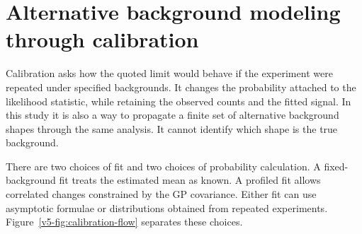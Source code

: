 \section{Alternative background modeling through calibration}
\label{v5-sec:calibration}\label{sec:v5-calibration}
Calibration asks how the quoted limit would behave if the experiment were
repeated under specified backgrounds. It changes the probability attached
to the likelihood statistic, while retaining the observed counts and the
fitted signal. In this study it is also a way to propagate a finite set of
alternative background shapes through the same analysis. It cannot identify
which shape is the true background.

There are two choices of fit and two choices of probability calculation.
A fixed-background fit treats the estimated mean as known. A profiled fit
allows correlated changes constrained by the GP covariance. Either fit
can use asymptotic formulae or distributions obtained from repeated
experiments. Figure~\ref{v5-fig:calibration-flow} separates these choices.

